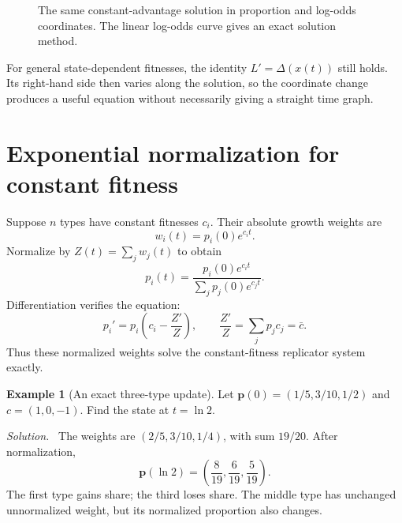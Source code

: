 \documentclass[11pt,oneside,openany]{book}
\theoremstyle{definition}
\newtheorem{example}{Example}[chapter]
\theoremstyle{remark}
\newenvironment{solution}{\par\smallskip\noindent\textit{Solution.}\ }{\par\smallskip}
\newcommand{\p}{\mathbf{p}}
\numberwithin{equation}{chapter}
\begin{document}
\begin{figure}[htbp]
\centering
{}
\caption{The same constant-advantage solution in proportion and log-odds coordinates. The linear log-odds curve gives an exact solution method.}
\end{figure}

For general state-dependent fitnesses, the identity $L'=\Delta(x(t))$ still holds. Its right-hand side then varies along the solution, so the coordinate change produces a useful equation without necessarily giving a straight time graph.

\section{Exponential normalization for constant fitness}
Suppose $n$ types have constant fitnesses $c_i$. Their absolute growth weights are
\[
w_i(t)=p_i(0)e^{c_it}.
\]
Normalize by $Z(t)=\sum_jw_j(t)$ to obtain
\begin{equation}\label{eq:expnormalization}
\boxed{p_i(t)=\frac{p_i(0)e^{c_it}}{\sum_jp_j(0)e^{c_jt}}.}
\end{equation}
Differentiation verifies the equation:
\[
p_i'=p_i\left(c_i-\frac{Z'}Z\right),\qquad
\frac{Z'}Z=\sum_jp_jc_j=\bar c.
\]
Thus these normalized weights solve the constant-fitness replicator system exactly.

\begin{example}[An exact three-type update]
Let $\p(0)=(1/5,3/10,1/2)$ and $c=(1,0,-1)$. Find the state at $t=\ln2$.
\begin{solution}
The weights are $(2/5,3/10,1/4)$, with sum $19/20$. After normalization,
\[
\p(\ln2)=\left(\frac8{19},\frac6{19},\frac5{19}\right).
\]
The first type gains share; the third loses share. The middle type has unchanged unnormalized weight, but its normalized proportion also changes.
\end{solution}
\end{example}
\end{document}
